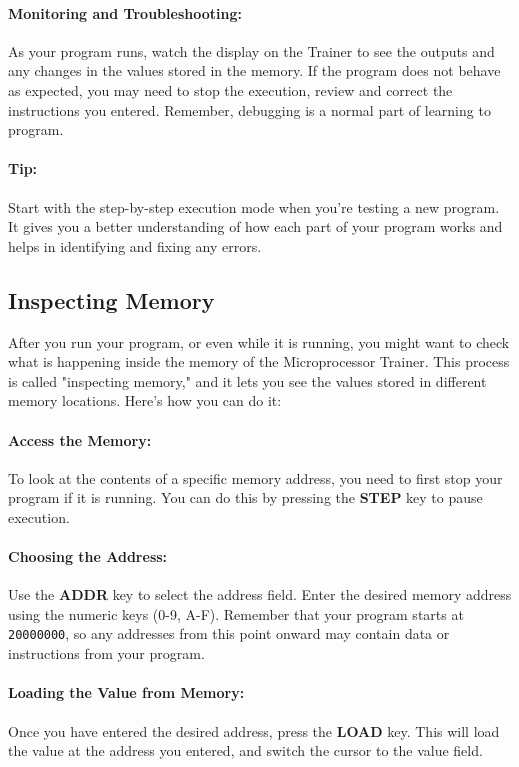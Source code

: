 \documentclass[12pt]{article}
\begin{document}
\paragraph{Monitoring and Troubleshooting:}
As your program runs, watch the display on the Trainer to see the outputs and any changes in the values stored in the memory. If the program does not behave as expected, you may need to stop the execution, review and correct the instructions you entered. Remember, debugging is a normal part of learning to program.
\paragraph{Tip:} Start with the step-by-step execution mode when you’re testing a new program. It gives you a better understanding of how each part of your program works and helps in identifying and fixing any errors.

\subsection{Inspecting Memory}

After you run your program, or even while it is running, you might want to check what is happening inside the memory of the Microprocessor Trainer. This process is called "inspecting memory," and it lets you see the values stored in different memory locations. Here’s how you can do it:

\paragraph{Access the Memory:}
To look at the contents of a specific memory address, you need to first stop your program if it is running. You can do this by pressing the \textbf{STEP} key to pause execution.

\paragraph{Choosing the Address:}
Use the \textbf{ADDR} key to select the address field. Enter the desired memory address using the numeric keys (0-9, A-F). Remember that your program starts at \texttt{20000000}, so any addresses from this point onward may contain data or instructions from your program.

\paragraph{Loading the Value from Memory:}
Once you have entered the desired address, press the \textbf{LOAD} key. This will load the value at the address you entered, and switch the cursor to the value field.
\end{document}
